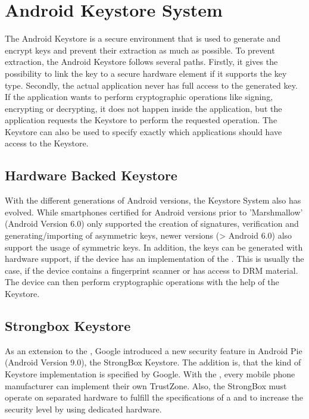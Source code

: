 \documentclass[12pt,oneside,a4paper,parskip]{scrbook}
\begin{document}
\section{Android Keystore System}
The Android Keystore is a secure environment that is used to generate and encrypt keys and prevent their extraction as much as possible. To prevent extraction, the Android Keystore follows several paths. Firstly, it gives the possibility to link the key to a secure hardware element if it supports the key type. Secondly, the actual application never has full access to the generated key. If the application wants to perform cryptographic operations like signing, encrypting or decrypting, it does not happen inside the application, but the application requests the Keystore to perform the requested operation. The Keystore can also be used to specify exactly which applications should have access to the Keystore. 
\parencite{google_android_2020}

\subsection{Hardware Backed Keystore}
\label{android:HWB}

With the different generations of Android versions, the Keystore System also has evolved. While smartphones certified for Android versions prior to 'Marshmallow' (Android Version 6.0) only supported the creation of signatures, verification and generating/importing of asymmetric keys, newer versions (> Android 6.0) also support the usage of symmetric keys. In addition, the keys can be generated with hardware support, if the device has an implementation of the . This is usually the case, if the device contains a fingerprint scanner or has access to DRM material. The device can then perform cryptographic operations with the help of the Keystore.
\parencite{google_hardware-backed_2020}


\subsection{Strongbox Keystore}
As an extension to the , Google introduced a new security feature in Android Pie (Android Version 9.0), the StrongBox Keystore. The addition is, that the kind of Keystore implementation is specified by Google. With the , every mobile phone manufacturer can implement their own TrustZone. Also, the StrongBox must operate on separated hardware to fulfill the specifications of a  and to increase the security level by using dedicated hardware.
\end{document}
